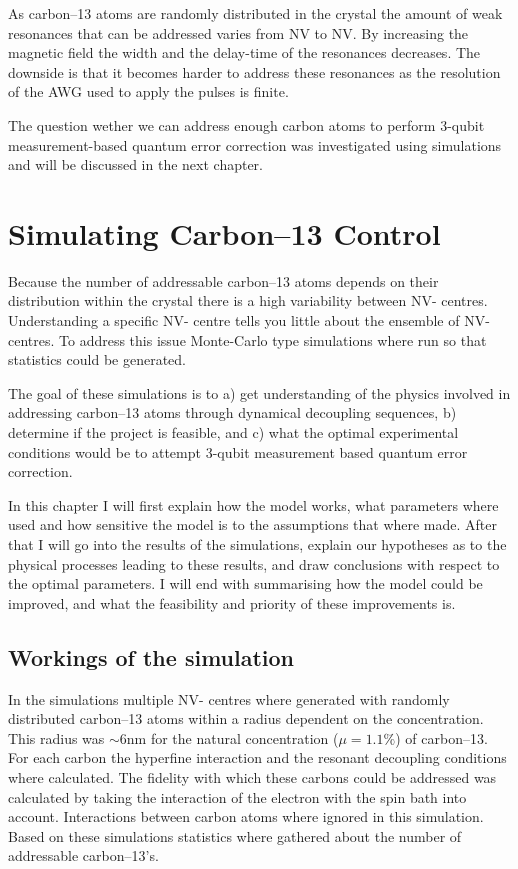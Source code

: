 As carbon--13 atoms are randomly distributed in the crystal the amount of weak resonances that can be addressed varies from NV to NV. By increasing the magnetic field the width and the delay-time of the resonances decreases. The downside is that it becomes harder to address these resonances as the resolution of the AWG used to apply the pulses is finite. 

The question wether we can address enough carbon atoms to perform 3-qubit measurement-based quantum error correction was investigated using simulations and will be discussed in the next chapter. 

\chapter{Simulating Carbon--13 Control}
\label{simulatingcarbon-13control}

Because the number of addressable carbon--13 atoms depends on their distribution within the crystal there is a high variability between NV- centres. Understanding a specific NV- centre tells you little about the ensemble of NV- centres. To address this issue Monte-Carlo type simulations where run so that statistics could be generated. 

The goal of these simulations is to a) get understanding of the physics involved in addressing carbon--13 atoms through dynamical decoupling sequences, b) determine if the project is feasible, and c) what the optimal experimental conditions would be to attempt 3-qubit measurement based quantum error correction. 

In this chapter I will first explain how the model works, what parameters where used and how sensitive the model is to the assumptions that where made. After that I will go into the results of the simulations, explain our hypotheses as to the physical processes leading to these results, and draw conclusions with respect to the optimal parameters. I will end with summarising how the model could be improved, and what the feasibility and priority of these improvements is. 

\section{Workings of the simulation}
\label{workingsofthesimulation}

In the simulations multiple NV- centres where generated with randomly distributed carbon--13 atoms within a radius dependent on the concentration. This radius was \ensuremath{\sim}6nm for the natural concentration ($\mu = 1.1\%$) of carbon--13. For each carbon the hyperfine interaction and the resonant decoupling conditions where calculated. The fidelity with which these carbons could be addressed was calculated by taking the interaction of the electron with the spin bath into account. Interactions between carbon atoms where ignored in this simulation. Based on these simulations statistics where gathered about the number of addressable carbon--13's. 

